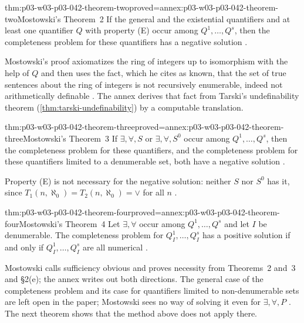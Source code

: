 \begin{hbtheorem}{thm:p03-w03-p03-042-theorem-two}{proved=annex:p03-w03-p03-042-theorem-two}{Mostowski's Theorem~2}
If the general and the existential quantifiers and at least one
quantifier \(Q\) with property (E) occur among \(Q^1,\ldots,Q^s\), then
the completeness problem for these quantifiers has a negative solution
\cite[p.~17]{Mostowski1957}.
\end{hbtheorem}

Mostowski's proof axiomatizes the ring of integers up to isomorphism with
the help of \(Q\) and then uses the fact, which he cites as known, that
the set of true sentences about the ring of integers is not recursively
enumerable, indeed not arithmetically definable
\cite[p.~19]{Mostowski1957}.  The annex derives that fact from
Tarski's undefinability theorem (\cref{thm:tarski-undefinability}) by a
computable translation.

\begin{hbtheorem}{thm:p03-w03-p03-042-theorem-three}{proved=annex:p03-w03-p03-042-theorem-three}{Mostowski's Theorem~3}
If \(\exists,\forall,S\) or \(\exists,\forall,S^0\) occur among
\(Q^1,\ldots,Q^s\), then the completeness problem for these quantifiers,
and the completeness problem for these quantifiers limited to a
denumerable set, both have a negative solution
\cite[p.~19]{Mostowski1957}.
\end{hbtheorem}

Property (E) is not necessary for the negative solution: neither \(S\)
nor \(S^0\) has it, since \(T_1(n,\aleph_0)=T_2(n,\aleph_0)=\vee\) for
all \(n\) \cite[p.~19]{Mostowski1957}.

\begin{hbtheorem}{thm:p03-w03-p03-042-theorem-four}{proved=annex:p03-w03-p03-042-theorem-four}{Mostowski's Theorem~4}
Let \(\exists,\forall\) occur among \(Q^1,\ldots,Q^s\) and let \(I\) be
denumerable.  The completeness problem for \(Q^1_I,\ldots,Q^s_I\) has a
positive solution if and only if \(Q^1_I,\ldots,Q^s_I\) are all numerical
\cite[p.~20]{Mostowski1957}.
\end{hbtheorem}

Mostowski calls sufficiency obvious and proves necessity from Theorems~2
and~3 and \S2(e); the annex writes out both directions.  The general case
of the completeness problem and its case for quantifiers limited to
non-denumerable sets are left open in the paper; Mostowski sees no way of
solving it even for \(\exists,\forall,P\) \cite[p.~20]{Mostowski1957}.
The next theorem shows that the method above does not apply there.

